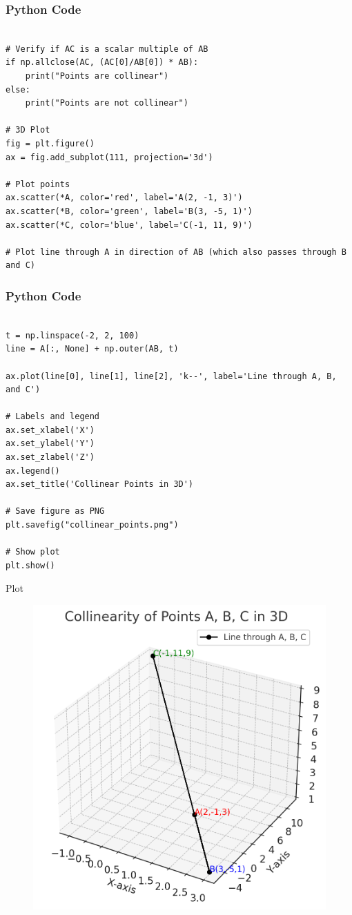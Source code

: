 \documentclass{beamer}
\begin{document}
\begin{frame}[fragile]
    \frametitle{Python Code}
    \begin{lstlisting}

# Verify if AC is a scalar multiple of AB
if np.allclose(AC, (AC[0]/AB[0]) * AB):
    print("Points are collinear")
else:
    print("Points are not collinear")

# 3D Plot
fig = plt.figure()
ax = fig.add_subplot(111, projection='3d')

# Plot points
ax.scatter(*A, color='red', label='A(2, -1, 3)')
ax.scatter(*B, color='green', label='B(3, -5, 1)')
ax.scatter(*C, color='blue', label='C(-1, 11, 9)')

# Plot line through A in direction of AB (which also passes through B and C)

    \end{lstlisting}
\end{frame}
\begin{frame}[fragile]
    \frametitle{Python Code}
    \begin{lstlisting}

t = np.linspace(-2, 2, 100)
line = A[:, None] + np.outer(AB, t)

ax.plot(line[0], line[1], line[2], 'k--', label='Line through A, B, and C')

# Labels and legend
ax.set_xlabel('X')
ax.set_ylabel('Y')
ax.set_zlabel('Z')
ax.legend()
ax.set_title('Collinear Points in 3D')

# Save figure as PNG
plt.savefig("collinear_points.png")

# Show plot
plt.show()

    \end{lstlisting}
\end{frame}
  
\begin{frame}{Plot}

\begin{figure}
    \centering
    \includegraphics[width=0.5\linewidth]{Beamer/figs/collinear_points.png}
    \caption{}
    \label{fig:placeholder}
\end{figure}



\end{frame}
\end{document}
